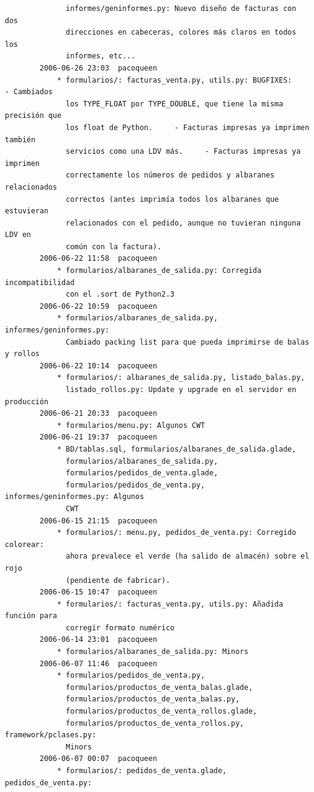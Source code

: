 \documentclass[a4paper]{article}
\begin{document}
\begin{verbatim}
              informes/geninformes.py: Nuevo diseño de facturas con dos
              direcciones en cabeceras, colores más claros en todos los
              informes, etc...
        2006-06-26 23:03  pacoqueen
            * formularios/: facturas_venta.py, utils.py: BUGFIXES:    - Cambiados
              los TYPE_FLOAT por TYPE_DOUBLE, que tiene la misma precisión que
              los float de Python.     - Facturas impresas ya imprimen también
              servicios como una LDV más.     - Facturas impresas ya imprimen
              correctamente los números de pedidos y albaranes relacionados
              correctos (antes imprimía todos los albaranes que estuvieran
              relacionados con el pedido, aunque no tuvieran ninguna LDV en
              común con la factura).
        2006-06-22 11:58  pacoqueen
            * formularios/albaranes_de_salida.py: Corregida incompatibilidad
              con el .sort de Python2.3
        2006-06-22 10:59  pacoqueen
            * formularios/albaranes_de_salida.py, informes/geninformes.py:
              Cambiado packing list para que pueda imprimirse de balas y rollos
        2006-06-22 10:14  pacoqueen
            * formularios/: albaranes_de_salida.py, listado_balas.py,
              listado_rollos.py: Update y upgrade en el servidor en producción
        2006-06-21 20:33  pacoqueen
            * formularios/menu.py: Algunos CWT
        2006-06-21 19:37  pacoqueen
            * BD/tablas.sql, formularios/albaranes_de_salida.glade,
              formularios/albaranes_de_salida.py,
              formularios/pedidos_de_venta.glade,
              formularios/pedidos_de_venta.py, informes/geninformes.py: Algunos
              CWT
        2006-06-15 21:15  pacoqueen
            * formularios/: menu.py, pedidos_de_venta.py: Corregido colorear:
              ahora prevalece el verde (ha salido de almacén) sobre el rojo
              (pendiente de fabricar).
        2006-06-15 10:47  pacoqueen
            * formularios/: facturas_venta.py, utils.py: Añadida función para
              corregir formato numérico
        2006-06-14 23:01  pacoqueen
            * formularios/albaranes_de_salida.py: Minors
        2006-06-07 11:46  pacoqueen
            * formularios/pedidos_de_venta.py,
              formularios/productos_de_venta_balas.glade,
              formularios/productos_de_venta_balas.py,
              formularios/productos_de_venta_rollos.glade,
              formularios/productos_de_venta_rollos.py, framework/pclases.py:
              Minors
        2006-06-07 00:07  pacoqueen
            * formularios/: pedidos_de_venta.glade, pedidos_de_venta.py:

\end{verbatim}
\end{document}
